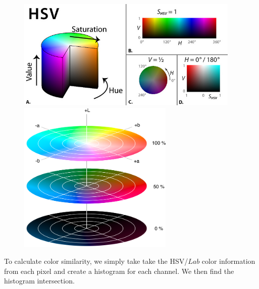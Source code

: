 \documentclass{article}
\begin{document}
\begin{figure}[htbp]
    \centering
    \begin{minipage}{0.45\textwidth}
        \centering
        \includegraphics[width=0.95\textwidth]{hsv.jpg} %
    \end{minipage}\hfill
    \begin{minipage}{0.45\textwidth}
        \centering
        \includegraphics[width=0.66\textwidth]{lab.png} %
    \end{minipage}
\end{figure}

To calculate color similarity, we simply take take the HSV/$Lab$ color information from each pixel and create a histogram for each channel. We then find the histogram intersection. 
\end{document}
